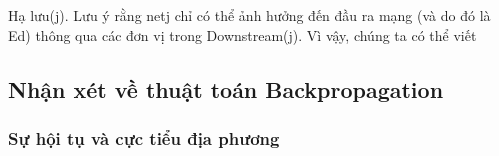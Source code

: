 Hạ lưu(j). Lưu ý rằng netj chỉ có thể ảnh hưởng đến đầu ra mạng (và do đó là Ed) thông qua các đơn vị trong Downstream(j). Vì vậy, chúng ta có thể viết

\subsection{Nhận xét về thuật toán Backpropagation}

\subsubsection{Sự hội tụ và cực tiểu địa phương}


